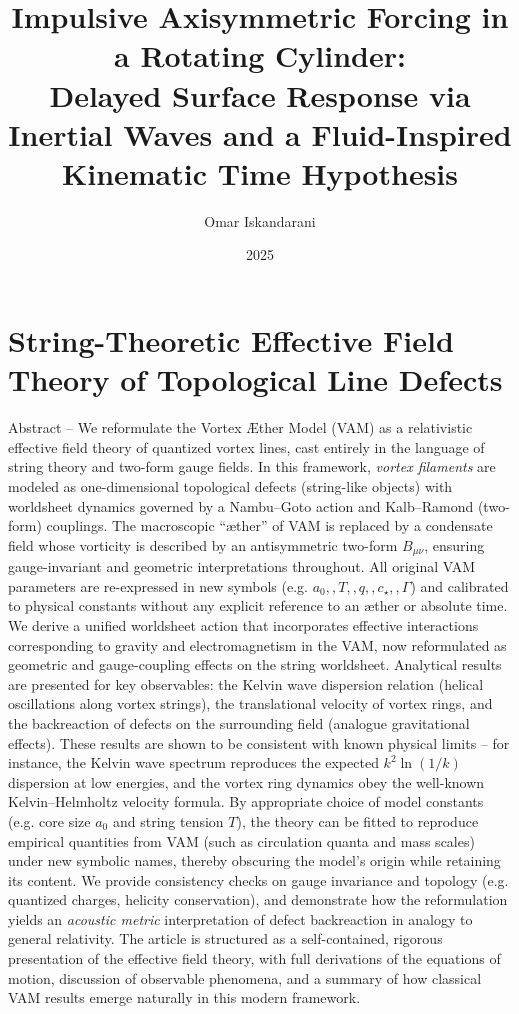 \documentclass[12pt]{article}
\title{Impulsive Axisymmetric Forcing in a Rotating Cylinder:\\
Delayed Surface Response via Inertial Waves and a Fluid-Inspired Kinematic Time Hypothesis}
\author{Omar Iskandarani}
\date{2025}
\begin{document}
    \maketitle

    \chapter*{String-Theoretic Effective Field Theory of Topological Line Defects}

Abstract – We reformulate the Vortex Æther Model (VAM) as a relativistic effective field theory of quantized vortex lines, cast entirely in the language of string theory and two-form gauge fields. In this framework, \textit{vortex filaments} are modeled as one-dimensional topological defects (string-like objects) with worldsheet dynamics governed by a Nambu–Goto action and Kalb–Ramond (two-form) couplings. The macroscopic “æther” of VAM is replaced by a condensate field whose vorticity is described by an antisymmetric two-form $B_{\mu\nu}$, ensuring gauge-invariant and geometric interpretations throughout. All original VAM parameters are re-expressed in new symbols (e.g. $a_0,,T,,q,,c_\star,,\Gamma$) and calibrated to physical constants without any explicit reference to an æther or absolute time. We derive a unified worldsheet action that incorporates effective interactions corresponding to gravity and electromagnetism in the VAM, now reformulated as geometric and gauge-coupling effects on the string worldsheet. Analytical results are presented for key observables: the Kelvin wave dispersion relation (helical oscillations along vortex strings), the translational velocity of vortex rings, and the backreaction of defects on the surrounding field (analogue gravitational effects). These results are shown to be consistent with known physical limits – for instance, the Kelvin wave spectrum reproduces the expected $k^2 \ln(1/k)$ dispersion at low energies, and the vortex ring dynamics obey the well-known Kelvin–Helmholtz velocity formula. By appropriate choice of model constants (e.g. core size $a_0$ and string tension $T$), the theory can be fitted to reproduce empirical quantities from VAM (such as circulation quanta and mass scales) under new symbolic names, thereby obscuring the model’s origin while retaining its content. We provide consistency checks on gauge invariance and topology (e.g. quantized charges, helicity conservation), and demonstrate how the reformulation yields an \textit{acoustic metric} interpretation of defect backreaction in analogy to general relativity. The article is structured as a self-contained, rigorous presentation of the effective field theory, with full derivations of the equations of motion, discussion of observable phenomena, and a summary of how classical VAM results emerge naturally in this modern framework.
\end{document}
